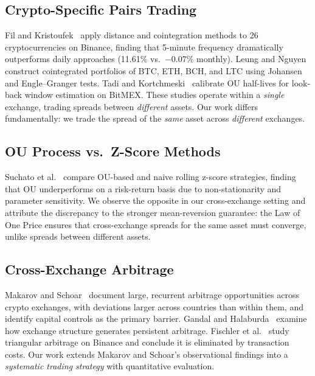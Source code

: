 \documentclass[sigconf,nonacm=false]{acmart}
\begin{document}
\subsection{Crypto-Specific Pairs Trading}

Fil and Kristoufek~\cite{fil2020pairs} apply distance and cointegration methods to 26 cryptocurrencies on Binance, finding that 5-minute frequency dramatically outperforms daily approaches (11.61\% vs.\ $-0.07$\% monthly). Leung and Nguyen~\cite{leung2019constructing} construct cointegrated portfolios of BTC, ETH, BCH, and LTC using Johansen and Engle--Granger tests. Tadi and Kortchmeski~\cite{tadi2021evaluation} calibrate OU half-lives for look-back window estimation on BitMEX. These studies operate within a \emph{single} exchange, trading spreads between \emph{different} assets. Our work differs fundamentally: we trade the spread of the \emph{same} asset across \emph{different} exchanges.

\subsection{OU Process vs.\ Z-Score Methods}

Suchato et al.~\cite{suchato2024application} compare OU-based and naive rolling z-score strategies, finding that OU underperforms on a risk-return basis due to non-stationarity and parameter sensitivity. We observe the opposite in our cross-exchange setting and attribute the discrepancy to the stronger mean-reversion guarantee: the Law of One Price ensures that cross-exchange spreads for the same asset must converge, unlike spreads between different assets.

\subsection{Cross-Exchange Arbitrage}

Makarov and Schoar~\cite{makarov2020trading} document large, recurrent arbitrage opportunities across crypto exchanges, with deviations larger across countries than within them, and identify capital controls as the primary barrier. Gandal and Halaburda~\cite{gandal2021key} examine how exchange structure generates persistent arbitrage. Fischler et al.~\cite{fischler2024wish} study triangular arbitrage on Binance and conclude it is eliminated by transaction costs. Our work extends Makarov and Schoar's observational findings into a \emph{systematic trading strategy} with quantitative evaluation.
\end{document}
